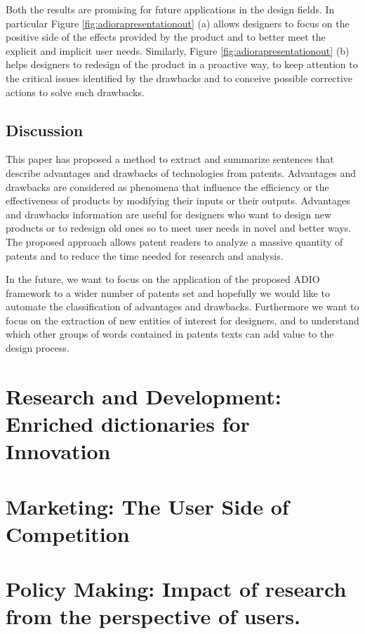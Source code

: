 \documentclass[]{book}
\begin{document}
Both the results are promising for future applications in the design
fields. In particular Figure \ref{fig:adiorapresentationout} (a) allows
designers to focus on the positive side of the effects provided by the
product and to better meet the explicit and implicit user needs.
Similarly, Figure \ref{fig:adiorapresentationout} (b) helps designers to
redesign of the product in a proactive way, to keep attention to the
critical issues identified by the drawbacks and to conceive possible
corrective actions to solve such drawbacks.

\section{Discussion}\label{discussion}

This paper has proposed a method to extract and summarize sentences that
describe advantages and drawbacks of technologies from patents.
Advantages and drawbacks are considered as phenomena that influence the
efficiency or the effectiveness of products by modifying their inputs or
their outputs. Advantages and drawbacks information are useful for
designers who want to design new products or to redesign old ones so to
meet user needs in novel and better ways. The proposed approach allows
patent readers to analyze a massive quantity of patents and to reduce
the time needed for research and analysis.

In the future, we want to focus on the application of the proposed ADIO
framework to a wider number of patents set and hopefully we would like
to automate the classification of advantages and drawbacks. Furthermore
we want to focus on the extraction of new entities of interest for
designers, and to understand which other groups of words contained in
patents texts can add value to the design process.

\chapter{Research and Development: Enriched dictionaries for
Innovation}\label{research-and-development-enriched-dictionaries-for-innovation}

\chapter{Marketing: The User Side of
Competition}\label{marketing-the-user-side-of-competition}

\chapter{Policy Making: Impact of research from the perspective of
users.}\label{policy-making-impact-of-research-from-the-perspective-of-users.}
\end{document}
